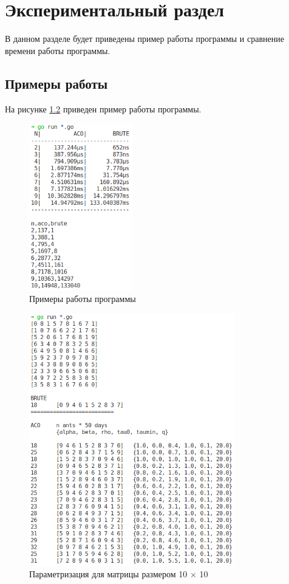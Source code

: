 \chapter{Экспериментальный раздел}
\label{cha:research}

В данном разделе будет приведены пример работы программы и сравнение времени работы программы.

\section{Примеры работы}
На рисунке \ref{fig:4.1} приведен пример работы программы.

\begin{figure}[h]
    \centering
    \includegraphics[width=0.4\textwidth]{6/inc/e1.png}
    \caption{Примеры работы программы}
    \label{fig:4.1}
\end{figure}

\begin{figure}[h]
    \centering
    \includegraphics[width=0.8\textwidth]{6/inc/e2.png}
    \caption{Параметризация для матрицы размером 10 × 10}
    \label{fig:4.1}
\end{figure}




